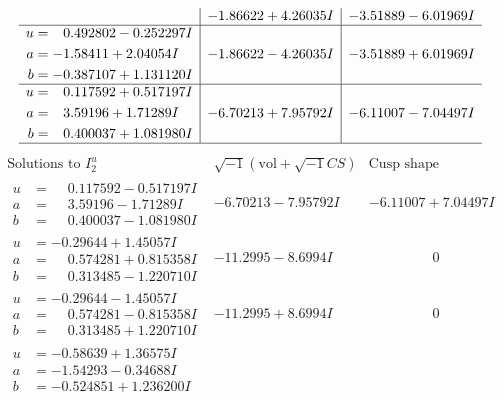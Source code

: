 \documentclass[1p]{elsarticle_modified}
\theoremstyle{definition}
\newcommand{\I}{\sqrt{-1}}
\begin{document}
$$\begin{array}{c|c|c}
 & -1.86622 + 4.26035 I & -3.51889 - 6.01969 I \\ \hline\begin{aligned}
u &= \phantom{-}0.492802 - 0.252297 I \\
a &= -1.58411 + 2.04054 I \\
b &= -0.387107 + 1.131120 I\end{aligned}
 & -1.86622 - 4.26035 I & -3.51889 + 6.01969 I \\ \hline\begin{aligned}
u &= \phantom{-}0.117592 + 0.517197 I \\
a &= \phantom{-}3.59196 + 1.71289 I \\
b &= \phantom{-}0.400037 + 1.081980 I\end{aligned}
 & -6.70213 + 7.95792 I & -6.11007 - 7.04497 I\\
 \hline 
 \end{array}$$\newpage$$\begin{array}{c|c|c}  
\text{Solutions to }I^u_{2}& \I (\text{vol} + \sqrt{-1}CS) & \text{Cusp shape}\\
 \hline 
\begin{aligned}
u &= \phantom{-}0.117592 - 0.517197 I \\
a &= \phantom{-}3.59196 - 1.71289 I \\
b &= \phantom{-}0.400037 - 1.081980 I\end{aligned}
 & -6.70213 - 7.95792 I & -6.11007 + 7.04497 I \\ \hline\begin{aligned}
u &= -0.29644 + 1.45057 I \\
a &= \phantom{-}0.574281 + 0.815358 I \\
b &= \phantom{-}0.313485 - 1.220710 I\end{aligned}
 & -11.2995 - 8.6994 I & \phantom{-0.000000 } 0 \\ \hline\begin{aligned}
u &= -0.29644 - 1.45057 I \\
a &= \phantom{-}0.574281 - 0.815358 I \\
b &= \phantom{-}0.313485 + 1.220710 I\end{aligned}
 & -11.2995 + 8.6994 I & \phantom{-0.000000 } 0 \\ \hline\begin{aligned}
u &= -0.58639 + 1.36575 I \\
a &= -1.54293 - 0.34688 I \\
b &= -0.524851 + 1.236200 I\end{aligned}

\end{array}$$
\end{document}
